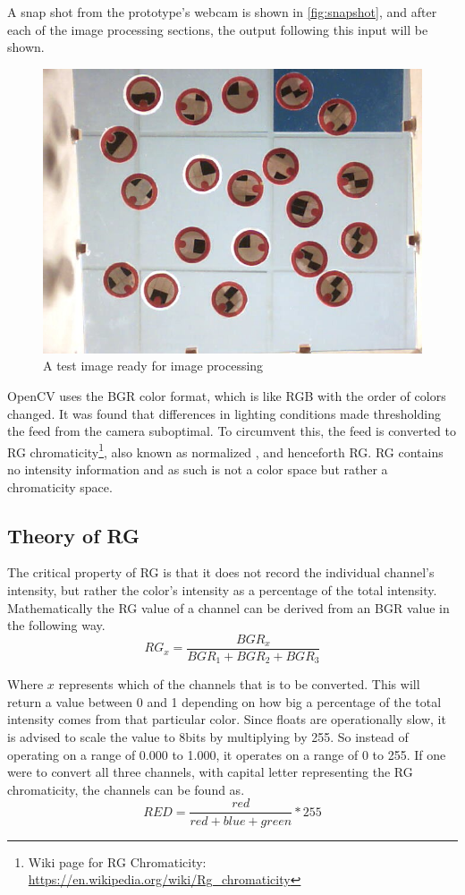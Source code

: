 A snap shot from the prototype's webcam is shown in \autoref{fig:snapshot}, and after each of the image processing sections, the output following this input will be shown.
\begin{figure}[H]
\centering
\includegraphics[width=0.6\linewidth]{figure/Analysis/testimage.jpg}
\caption{A test image ready for image processing}
\label{fig:snapshot}
\end{figure} 
OpenCV uses the BGR color format, which is like RGB with the order of colors changed.
It was found that differences in lighting conditions made thresholding the feed from the camera suboptimal. To circumvent this, the feed is converted to RG chromaticity\footnote{Wiki page for RG Chromaticity: \url{https://en.wikipedia.org/wiki/Rg_chromaticity}}, also known as normalized , and henceforth RG. RG contains no intensity information and as such is not a color space but rather a chromaticity space.
\subsection{Theory of RG}\label{sec:theoryOfRG}

The critical property of RG is that it does not record the individual channel's intensity, but rather the color's intensity as a percentage of the total intensity. Mathematically the RG value of a channel can be derived from an BGR value in the following way.
\begin{equation} 
 RG_x = \frac{BGR_x}{BGR_1 + BGR_2 + BGR_3}
\end{equation} 

Where $x$ represents which of the channels that is to be converted. This will return a value between 0 and 1 depending on how big a percentage of the total intensity comes from that particular color. Since floats are operationally slow, it is advised to scale the value to 8bits by multiplying by 255. So instead of operating on a range of 0.000 to 1.000, it operates on a range of 0 to 255. If one were to convert all three channels, with capital letter representing the RG chromaticity, the channels can be found as.
\begin{equation} 
RED = \frac{red}{red + blue + green} * 255
\end{equation} 

